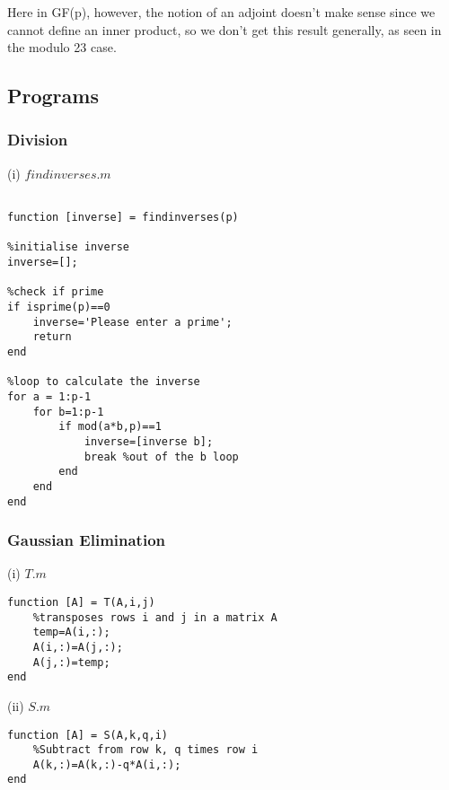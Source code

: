 \documentclass[10pt,a4paper]{report}
\begin{document}
Here in GF(p), however, the notion of an adjoint doesn't make sense since we cannot define an inner product, so we don't get this result generally, as seen in the modulo 23 case.



\newpage

\subsection*{Programs}

\vspace{1cm}

\subsubsection{Division}

\vspace{0.5cm}

(i) $findinverses.m$
\begin{verbatim}

function [inverse] = findinverses(p)

%initialise inverse
inverse=[];

%check if prime
if isprime(p)==0
    inverse='Please enter a prime';
    return
end

%loop to calculate the inverse
for a = 1:p-1
    for b=1:p-1
        if mod(a*b,p)==1
            inverse=[inverse b];
            break %out of the b loop
        end
    end
end

\end{verbatim}
 
\vspace{1cm}

\subsubsection{Gaussian Elimination}
\vspace{0.5cm}

(i) $T.m$
\begin{verbatim}
function [A] = T(A,i,j)
    %transposes rows i and j in a matrix A
    temp=A(i,:);
    A(i,:)=A(j,:);
    A(j,:)=temp;
end
\end{verbatim}
\vspace{0.5cm}

(ii) $S.m$
\begin{verbatim}
function [A] = S(A,k,q,i)  
    %Subtract from row k, q times row i
    A(k,:)=A(k,:)-q*A(i,:);
end
\end{verbatim}
\vspace{0.5cm}
\end{document}
